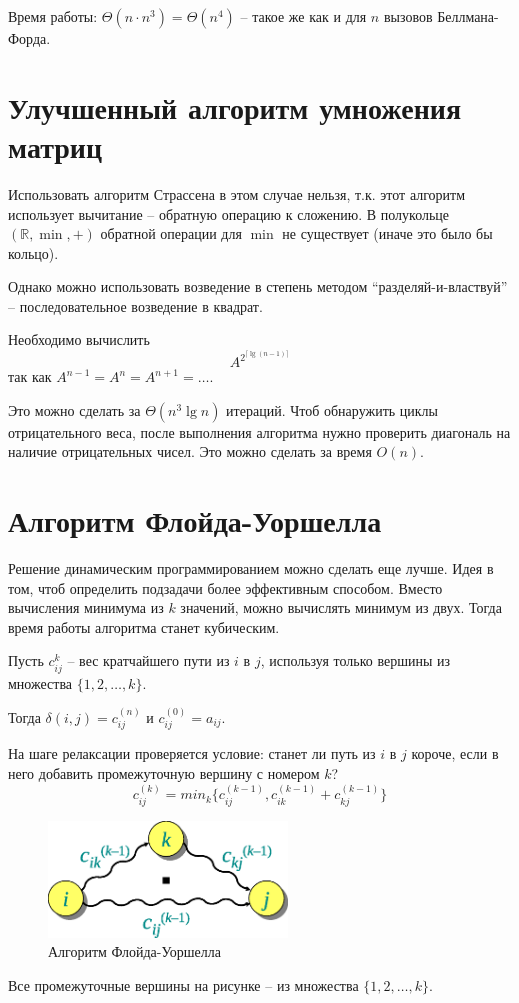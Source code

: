 \documentclass[11pt]{article}
\begin{document}
Время работы: $\Theta(n\cdot n^3) = \Theta(n^4)$ -- такое же как и для $n$ вызовов Беллмана-Форда.
\section{Улучшенный алгоритм умножения матриц}
Использовать алгоритм Страссена в этом случае нельзя, т.к. этот алгоритм использует вычитание -- обратную операцию к сложению. В полукольце $(\mathbb{R}, \min, +)$ обратной операции для $\min$ не существует (иначе это было бы кольцо).

Однако можно использовать возведение в степень методом ``разделяй-и-властвуй'' -- последовательное возведение в квадрат.

Необходимо вычислить
\begin{equation*}
  A^{2^{\lceil \lg(n-1) \rceil}}
\end{equation*}
так как $A^{n-1} = A^n = A^{n+1} = \ldots$.

Это можно сделать за $\Theta(n^3 \lg n)$ итераций. Чтоб обнаружить циклы отрицательного веса, после выполнения алгоритма нужно проверить диагональ на наличие отрицательных чисел. Это можно сделать за время $O(n)$. 
\section{Алгоритм Флойда-Уоршелла}
Решение динамическим программированием можно сделать еще лучше. Идея в том, чтоб определить подзадачи более эффективным способом. Вместо вычисления минимума из $k$ значений, можно вычислять минимум из двух. Тогда время работы алгоритма станет кубическим.

Пусть $c_{i j}^k$ -- вес кратчайшего пути из $i$ в $j$, используя только вершины из множества $\{1, 2, \ldots, k\}$.

Тогда $\delta(i, j) = c_{i j}^{(n)}$ и $c_{i j}^{(0)} = a_{i j}$.

На шаге релаксации проверяется условие: станет ли путь из $i$ в $j$ короче, если в него добавить промежуточную вершину с номером $k$?
\begin{equation*}
  c_{i j}^{(k)} = min_k \{c_{i j}^{(k-1)}, c_{i k}^{(k-1)} + c_{k j}^{(k-1)}\}
\end{equation*}
\begin{figure}[ht!]
  \centering
  \includegraphics[width=2.5in]{lecture19/fwarshall.eps}
  \caption{Алгоритм Флойда-Уоршелла}
\end{figure}
Все промежуточные вершины на рисунке -- из множества $\{1, 2, \ldots, k\}$.
\end{document}

